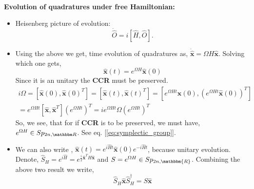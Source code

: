 \documentclass[english,10pt,a4paper]{article}
\newcommand{\xx}{\hat{\textbf{x}}}
\begin{document}
	\textbf{Evolution of quadratures under free Hamiltonian:} 
	\begin{itemize}
		\item Heisenberg picture of evolution:
		\label{eq:heisenberg}
		\begin{equation}
			 \dot{\hat O} = i[\hat{H}, \hat{O}].
		\end{equation}
		\item Using the above we get, time evolution of quadratures as, $\dot{\xx} = \Omega H \xx$. Solving which one gets,
		\begin{equation}
			\label{eq:free_evolution}
			 \xx(t) = e^{\Omega H} \xx(0)
		\end{equation}
		Since it is an unitary the \textbf{CCR} must be preserved.
		\begin{align}
			i\Omega = [\xx(0), \xx(0)^T] = [\xx(t), \xx(t)^T]  =[e^{\Omega H t} \xx(0), \left(e^{\Omega H t} \xx(0)\right)^T] \\
			= e^{\Omega H t}[\xx, \xx^T] \left(e^{\Omega H t} \right)^T = i e^{\Omega H t} \Omega  \left(e^{\Omega H t} \right)^T
		\end{align}
		So, we see, that for if \textbf{CCR} is to be preserved,  we must have, $e^{\Omega H} \in Sp_{2n,\mathbbm R}$. See eq. [\ref{eq:symplectic_group}].
		\item We can also write , $\xx(t) = e^{i\hat{H} t} \xx(0) e^{-i\hat{H} t}$, because unitary evolution. Denote, $\hat{S}_H = e^{i\hat{H}} = e^{\frac{i}{2} \xx^T H \xx}$ and $S=e^{\Omega H}\in Sp_{2n, \mathbbm{R}}$. Combining the above two result we write,
		\begin{equation}
			\label{eq:symplectic_evolution}
			\hat{S}_H \xx \hat{S}_H^\dagger = S\xx
		\end{equation}
		
	\end{itemize}
	
\end{document}
